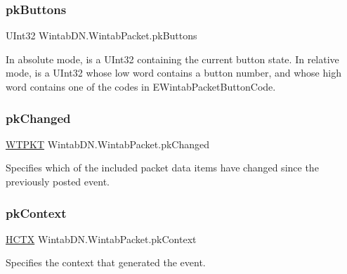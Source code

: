 \subsubsection{\texorpdfstring{pk\+Buttons}{pkButtons}}
{\footnotesize\ttfamily U\+Int32 Wintab\+D\+N.\+Wintab\+Packet.\+pk\+Buttons}



In absolute mode, is a U\+Int32 containing the current button state. In relative mode, is a U\+Int32 whose low word contains a button number, and whose high word contains one of the codes in E\+Wintab\+Packet\+Button\+Code. 

\mbox{\label{struct_wintab_d_n_1_1_wintab_packet_aa2d358ed11aeb84cd10c943c17c123c1}} 
\subsubsection{\texorpdfstring{pk\+Changed}{pkChanged}}
{\footnotesize\ttfamily \mbox{\hyperlink{class_wintab_d_n_1_1_w_t_p_k_t}{W\+T\+P\+KT}} Wintab\+D\+N.\+Wintab\+Packet.\+pk\+Changed}



Specifies which of the included packet data items have changed since the previously posted event. 

\mbox{\label{struct_wintab_d_n_1_1_wintab_packet_a61891db49d8d8f38ace11982c406d27f}} 
\subsubsection{\texorpdfstring{pk\+Context}{pkContext}}
{\footnotesize\ttfamily \mbox{\hyperlink{class_wintab_d_n_1_1_h_c_t_x}{H\+C\+TX}} Wintab\+D\+N.\+Wintab\+Packet.\+pk\+Context}



Specifies the context that generated the event. 

\mbox{\label{struct_wintab_d_n_1_1_wintab_packet_a1e426b5b92617ed4a6ad158a415f3c88}} 
